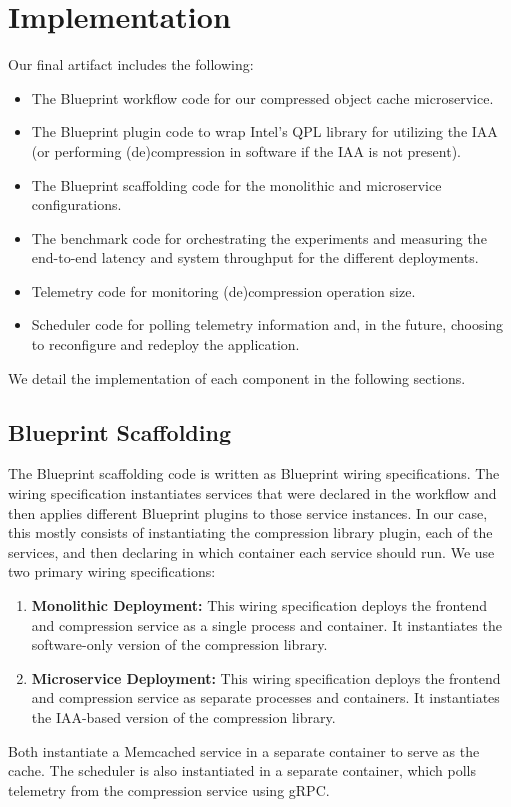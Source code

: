 \section{Implementation}

Our final artifact includes the following:
\begin{itemize}
    \item The Blueprint workflow code for our compressed object cache microservice.
    \item The Blueprint plugin code to wrap Intel's QPL library for utilizing the IAA (or performing (de)compression in software if the IAA is not present).
    \item The Blueprint scaffolding code for the monolithic and microservice configurations.
    \item The benchmark code for orchestrating the experiments and measuring the end-to-end latency and system throughput for the different deployments.
    \item Telemetry code for monitoring (de)compression operation size.
    \item Scheduler code for polling telemetry information and, in the future, choosing to reconfigure and redeploy the application.
\end{itemize}

We detail the implementation of each component in the following sections.

\subsection{Blueprint Scaffolding}

The Blueprint scaffolding code is written as Blueprint wiring specifications. The wiring specification instantiates services that were declared in the workflow and then applies different Blueprint plugins to those service instances.
In our case, this mostly consists of instantiating the compression library plugin, each of the services, and then declaring in which container each service should run.
We use two primary wiring specifications:
\begin{enumerate}
    \item \textbf{Monolithic Deployment:} This wiring specification deploys the frontend and compression service as a single process and container. It instantiates the software-only version of the compression library.
    \item \textbf{Microservice Deployment:} This wiring specification deploys the frontend and compression service as separate processes and containers. It instantiates the IAA-based version of the compression library.
\end{enumerate}
Both instantiate a Memcached service in a separate container to serve as the cache. The scheduler is also instantiated in a separate container, which polls telemetry from the compression service using gRPC.

